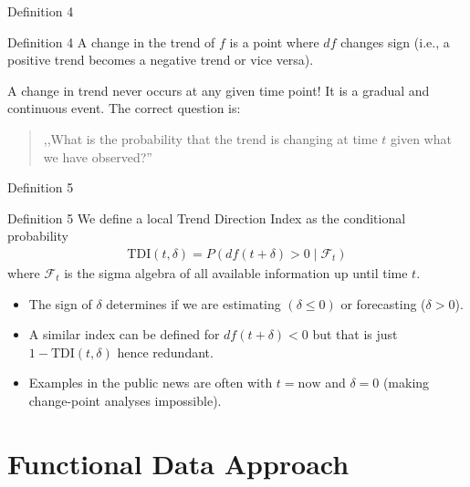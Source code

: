\documentclass[ignorenonframetext,xcolor=pdflatex,table,dvipsnames,serif]{beamer}
\begin{document}
\begin{frame}{Definition 4}
\begin{alertblock}{Definition 4}
  A \alert{change in the trend} of $f$ is a point where $df$ changes sign (i.e., a positive trend becomes a negative trend or vice versa).
  
  \pause
 
  \vspace{1cm}
  
  A change in trend \alert{never} occurs at any given time point! It is a gradual and continuous event. The correct question is:
  \begin{quotation}
	  ,,What is the \alert{probability} that the trend is changing at time $t$ given what we have observed?''
  \end{quotation}
\end{alertblock}    
\end{frame}


\begin{frame}{Definition 5}
\begin{alertblock}{Definition 5}
  We define a local \alert{Trend Direction Index} as the conditional probability
  \begin{align*}
    \mathrm{TDI}(t, \delta) = P(df(t + \delta) > 0 \mid \mathcal{F}_t)
  \end{align*}
  where $\mathcal{F}_t$ is the sigma algebra of all available information up until time $t$.
\end{alertblock}    

\pause

\vspace{0.5cm}
\begin{itemize}
	\item{The sign of $\delta$ determines if we are estimating $(\delta \leq 0)$ or forecasting ($\delta > 0$).}
	\item{A similar index can be defined for $df(t + \delta) < 0$ but that is just $1 - \mathrm{TDI}(t, \delta)$ hence redundant.}
	\item{Examples in the public news are often with $t = \mathrm{now}$ and $\delta = 0$ (making change-point analyses impossible).}
\end{itemize}
\end{frame}



\section{Functional Data Approach}
\end{document}
